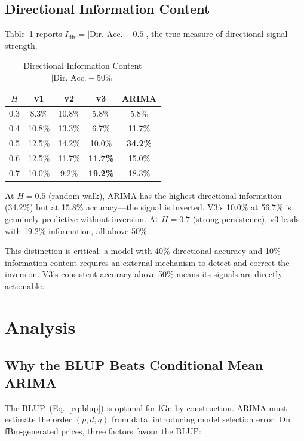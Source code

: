 \documentclass[12pt,a4paper]{article}
\begin{document}
\subsection{Directional Information Content}

Table~\ref{tab:dir_info} reports $I_{\text{dir}} = |\text{Dir.\ Acc.} - 0.5|$,
the true measure of directional signal strength.

\begin{table}[htbp]
  \centering
  \caption{Directional Information Content $|\text{Dir.\ Acc.} - 50\%|$}
  \label{tab:dir_info}
  \begin{tabular}{c cccc}
    \toprule
    $H$ & v1 & v2 & v3 & ARIMA \\
    \midrule
    0.3 &  8.3\% & 10.8\% &  5.8\% &  5.8\% \\
    0.4 & 10.8\% & 13.3\% &  6.7\% & 11.7\% \\
    0.5 & 12.5\% & 14.2\% & 10.0\% & \textbf{34.2\%} \\
    0.6 & 12.5\% & 11.7\% & \textbf{11.7\%} & 15.0\% \\
    0.7 & 10.0\% &  9.2\% & \textbf{19.2\%} & 18.3\% \\
    \bottomrule
  \end{tabular}
\end{table}

At $H = 0.5$ (random walk), ARIMA has the highest directional information
(34.2\%) but at 15.8\% accuracy---the signal is inverted.  V3's 10.0\% at
56.7\% is genuinely predictive without inversion.  At $H = 0.7$
(strong persistence), v3 leads with 19.2\% information, all above 50\%.

This distinction is critical: a model with 40\% directional accuracy and
10\% information content requires an external mechanism to detect and
correct the inversion.  V3's consistent accuracy above 50\% means its
signals are directly actionable.

\section{Analysis}
\label{sec:analysis}

\subsection{Why the BLUP Beats Conditional Mean ARIMA}

The BLUP~(Eq.~\ref{eq:blup}) is optimal for fGn by construction.  ARIMA
must estimate the order $(p,d,q)$ from data, introducing model selection
error.  On fBm-generated prices, three factors favour the BLUP:
\end{document}
